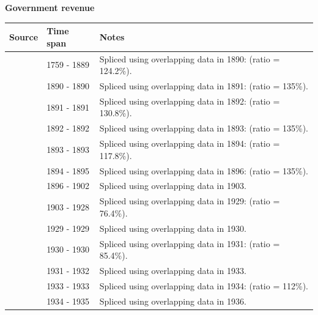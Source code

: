 \documentclass[12pt,a4paper,landscape]{article}
\begin{document}
\begin{adjustbox}{max totalsize={\paperwidth}{\paperheight},center}
\begin{minipage}[t][\textheight][t]{\textwidth}
\vspace*{0.5cm}
{}
\begin{center}
{\Large\bfseries Government revenue}
\end{center}
\vspace{0.5cm}
\begin{table}[H]
\centering
\small
\begin{tabular}{|l|l|l|}
\hline
\textbf{Source} & \textbf{Time span} & \textbf{Notes} \\
\hline
\rowcolor{white}\cite{Mitchell}& 1759 - 1889 &Spliced using overlapping data in 1890: (ratio = 124.2\%). \\
\rowcolor{lightgray}\cite{HFS}& 1890 - 1890 &Spliced using overlapping data in 1891: (ratio = 135\%). \\
\rowcolor{white}\cite{Mitchell}& 1891 - 1891 &Spliced using overlapping data in 1892: (ratio = 130.8\%). \\
\rowcolor{lightgray}\cite{HFS}& 1892 - 1892 &Spliced using overlapping data in 1893: (ratio = 135\%). \\
\rowcolor{white}\cite{Mitchell}& 1893 - 1893 &Spliced using overlapping data in 1894: (ratio = 117.8\%). \\
\rowcolor{lightgray}\cite{HFS}& 1894 - 1895 &Spliced using overlapping data in 1896: (ratio = 135\%). \\
\rowcolor{white}\cite{Mitchell}& 1896 - 1902 &Spliced using overlapping data in 1903. \\
\rowcolor{lightgray}\cite{GMD_estimated}& 1903 - 1928 &Spliced using overlapping data in 1929: (ratio = 76.4\%). \\
\rowcolor{white}\cite{Mitchell}& 1929 - 1929 &Spliced using overlapping data in 1930. \\
\rowcolor{lightgray}\cite{GMD_estimated}& 1930 - 1930 &Spliced using overlapping data in 1931: (ratio = 85.4\%). \\
\rowcolor{white}\cite{Mitchell}& 1931 - 1932 &Spliced using overlapping data in 1933. \\
\rowcolor{lightgray}\cite{GMD_estimated}& 1933 - 1933 &Spliced using overlapping data in 1934: (ratio = 112\%). \\
\rowcolor{white}\cite{Mitchell}& 1934 - 1935 &Spliced using overlapping data in 1936. \\

\end{tabular}
\end{table}
\end{minipage}
\end{adjustbox}
\end{document}

